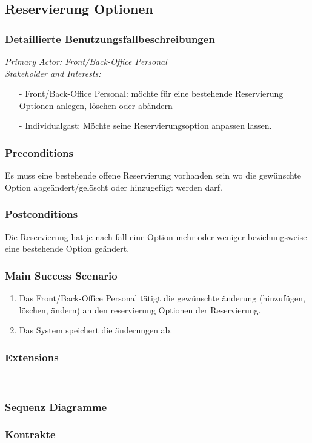\documentclass[./detailed_overview_usecases.tex]{subfiles}
\begin{document}
    \subsection{Reservierung Optionen}
    \subsubsection{Detaillierte Benutzungsfallbeschreibungen}
    \textit{Primary Actor: Front/Back-Office Personal}
    \\
    \textit{Stakeholder and Interests:}
    \begin{itemize}
        \item[-] Front/Back-Office Personal: möchte für eine bestehende Reservierung Optionen anlegen, löschen oder abändern
        \item[-] Individualgast: Möchte seine Reservierungsoption anpassen lassen.
    \end{itemize}

    \subsubsection*{Preconditions}
    Es muss eine bestehende offene Reservierung vorhanden sein wo die gewünschte Option abgeändert/gelöscht oder hinzugefügt werden darf.

    \subsubsection*{Postconditions}
    Die Reservierung hat je nach fall eine Option mehr oder weniger beziehungsweise eine bestehende Option geändert.

    \subsubsection*{Main Success Scenario}
    \begin{enumerate}
        \item Das Front/Back-Office Personal tätigt die gewünschte änderung (hinzufügen, löschen, ändern) an den reservierung Optionen der Reservierung.
        \item Das System speichert die änderungen ab.
    \end{enumerate}

    \subsubsection*{Extensions}
    -
    \subsubsection{Sequenz Diagramme}
    \subsubsection{Kontrakte}
\end{document}
